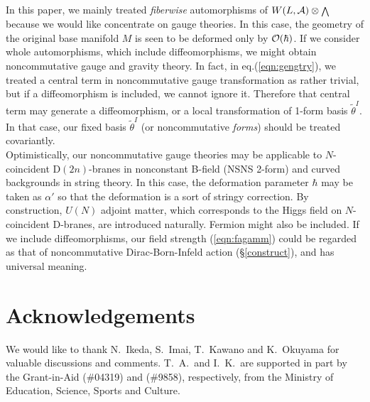 \documentclass[10pt,a4paper]{article}
\def\h{\hbar}
\begin{document}
In this paper, we mainly treated {\it fiberwise} automorphisms of $W(L,{\cal A})\otimes {\scriptstyle \bigwedge}$ because we would like concentrate on gauge theories. In this case, the geometry of the original base manifold $M$ is seen to be deformed only by ${\cal O}(\h)$. If we consider whole automorphisms, which include diffeomorphisms, we might obtain noncommutative gauge and gravity theory. In fact, in eq.(\ref{eqn:gengtry}), we treated a central term in noncommutative gauge transformation as rather trivial, but if a diffeomorphism is included, we cannot ignore it. Therefore that central term may generate a diffeomorphism, or a local transformation of 1-form basis ${\tilde \theta}^I$. In that case, our fixed basis ${\tilde \theta}^I$ (or noncommutative {\it forms}) should be treated covariantly.\\

Optimistically, our noncommutative gauge theories may be applicable to $N$-coincident D$(2n)$-branes in nonconstant B-field (NSNS 2-form) and curved backgrounds in string theory. In this case, the deformation parameter $\h$ may be taken as $\alpha'$ so that the deformation is a sort of stringy correction. By construction, $U(N)$ adjoint matter, which corresponds to the Higgs field on $N$-coincident D-branes, are introduced naturally. Fermion might also be included. If we include diffeomorphisms, our field strength (\ref{eqn:fagamm}) could be regarded as that of noncommutative Dirac-Born-Infeld action (\S\ref{construct}), and has universal meaning. 

\section*{Acknowledgements}
We would like to thank N.~Ikeda, S.~Imai, T.~Kawano and K.~Okuyama for valuable discussions and comments. 
T.~A.\ and I.~K.\ are supported in part by the Grant-in-Aid (\#04319) and (\#9858), respectively, from the Ministry of Education, Science, Sports and Culture.

\appendix
\end{document}
